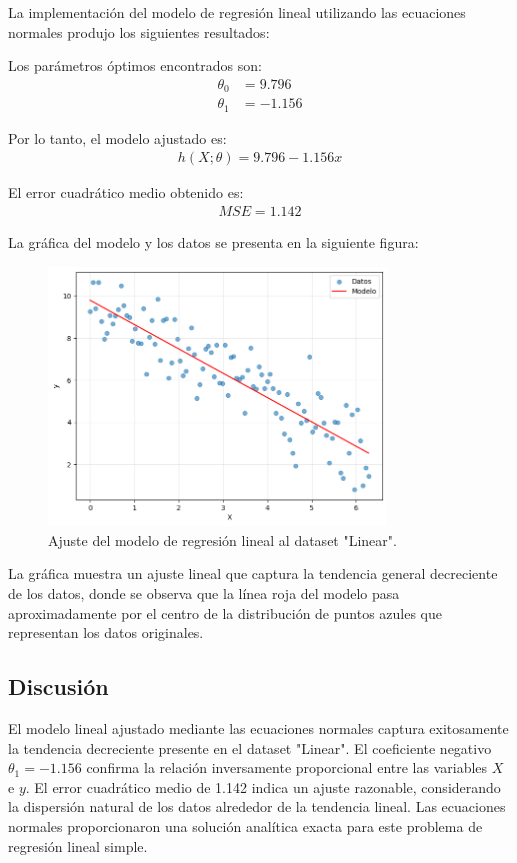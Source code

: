 \documentclass{article}
\begin{document}
La implementación del modelo de regresión lineal utilizando las ecuaciones normales produjo los siguientes resultados:

Los parámetros óptimos encontrados son:
\begin{align}
    \theta_0 &= 9.796 \\
    \theta_1 &= -1.156
\end{align}

Por lo tanto, el modelo ajustado es:
\begin{align}
    h(X;\theta) = 9.796 - 1.156x
\end{align}

El error cuadrático medio obtenido es:
\begin{align}
    MSE = 1.142
\end{align}

La gráfica del modelo y los datos se presenta en la siguiente figura:

\begin{figure}[H]
    \centering
    \includegraphics[width=0.8\textwidth]{images/7_regresion.png}
    \caption{Ajuste del modelo de regresión lineal al dataset "Linear".}
\end{figure}

La gráfica muestra un ajuste lineal que captura la tendencia general decreciente de los datos, donde se observa que la línea roja del modelo pasa aproximadamente por el centro de la distribución de puntos azules que representan los datos originales.

\subsection{Discusión}

El modelo lineal ajustado mediante las ecuaciones normales captura exitosamente la tendencia decreciente presente en el dataset "Linear". El coeficiente negativo $\theta_1 = -1.156$ confirma la relación inversamente proporcional entre las variables $X$ e $y$. El error cuadrático medio de 1.142 indica un ajuste razonable, considerando la dispersión natural de los datos alrededor de la tendencia lineal. Las ecuaciones normales proporcionaron una solución analítica exacta para este problema de regresión lineal simple.
\end{document}
